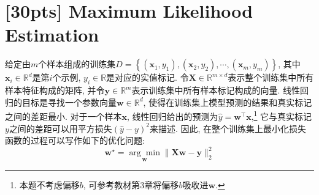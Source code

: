 \documentclass[a4paper,UTF8]{article}
\numberwithin{equation}{section}
\theoremstyle{definition}
\newcommand{\vct}[1]{\boldsymbol{#1}} %
\newcommand{\vw}{\vct{w}}
\newcommand{\vx}{\vct{x}}
\newcommand{\vy}{\vct{y}}
\newcommand{\mat}[1]{\boldsymbol{#1}} %
\newcommand{\mX}{\mat{X}}
\begin{document}
\section{[30pts] Maximum Likelihood Estimation}
给定由$m$个样本组成的训练集$D=\left\{(\vx_1,y_1),(\vx_2,y_2),\cdots,(\vx_m,y_m)\right\}$, 其中$\vx_i\in\mathbb{R}^{d}$是第$i$个示例, $y_i\in\mathbb{R}$是对应的实值标记. 令$\mX\in\mathbb{R}^{m\times d}$表示整个训练集中所有样本特征构成的矩阵, 并令$\vy\in\mathbb{R}^{m}$表示训练集中所有样本标记构成的向量. 线性回归的目标是寻找一个参数向量$\vw\in\mathbb{R}^{d}$, 使得在训练集上模型预测的结果和真实标记之间的差距最小. 对于一个样本$\vx$, 线性回归给出的预测为$\hat{y}=\vw^\top\vx$,\footnote{本题不考虑偏移$b$, 可参考教材第3章将偏移$b$吸收进$\vw$. } 它与真实标记$y$之间的差距可以用平方损失$(\hat{y}-y)^2$来描述. 因此, 在整个训练集上最小化损失函数的过程可以写作如下的优化问题:
\begin{equation}
    \vw^\star=\underset{\vw}{\arg\min}\|\mX\vw-\vy\|_2^2
    \label{linear_regression_target}
\end{equation}
\end{document}
